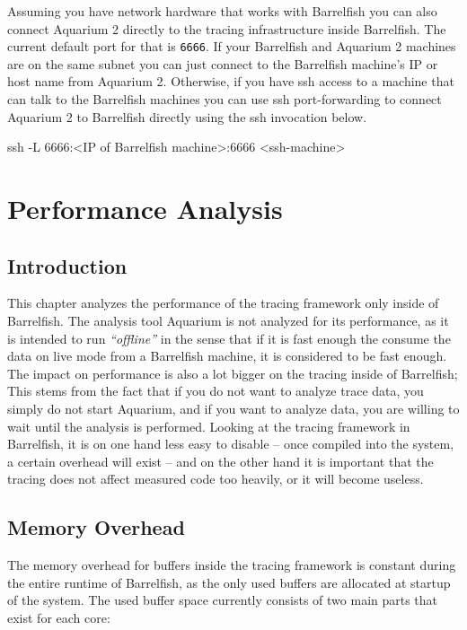 \documentclass[a4paper,11pt,twoside]{report}
\begin{document}
Assuming you have network hardware that works with Barrelfish you can also
connect Aquarium 2 directly to the tracing infrastructure inside Barrelfish. The
current default port for that is \verb!6666!.  If your Barrelfish and Aquarium 2
machines are on the same subnet you can just connect to the Barrelfish machine's
IP or host name from Aquarium 2.  Otherwise, if you have ssh access to a machine
that can talk to the Barrelfish machines you can use ssh port-forwarding to
connect Aquarium 2 to Barrelfish directly using the ssh invocation below.

\begin{code}
ssh -L 6666:\textless IP of Barrelfish machine\textgreater:6666 \textless ssh-machine\textgreater
\end{code}

\chapter{Performance Analysis}

\section{Introduction}

This chapter analyzes the performance of the tracing framework only inside of
Barrelfish. The analysis tool Aquarium is not analyzed for its performance, as
it is intended to run \emph{``offline''} in the sense that if it is fast enough
the consume the data on live mode from a Barrelfish machine, it is considered to
be fast enough. The impact on performance is also a lot bigger on the tracing
inside of Barrelfish; This stems from the fact that if you do not want to
analyze trace data, you simply do not start Aquarium, and if you want to analyze
data, you are willing to wait until the analysis is performed. Looking at the
tracing framework in Barrelfish, it is on one hand less easy to disable -- once
compiled into the system, a certain overhead will exist -- and on the other hand
it is important that the tracing does not affect measured code too heavily, or
it will become useless.

\section{Memory Overhead}

The memory overhead for buffers inside the tracing framework is constant during
the entire runtime of Barrelfish, as the only used buffers are allocated at
startup of the system. The used buffer space currently consists of two main
parts that exist for each core:
\end{document}
